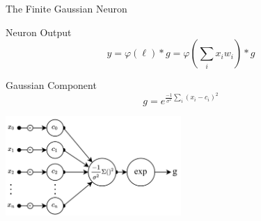 \documentclass{beamer}
\begin{document}
\begin{frame}{The Finite Gaussian Neuron}
    \begin{block}{Neuron Output}
        $$ y =  \varphi(\ell)*g = \varphi(\sum_i x_i w_i) * g$$
    \end{block}
    \begin{block}{Gaussian Component}
    $$ g = e^{\frac{-1}{\sigma^2}\sum_{i}(x_i-c_i)^2}$$
    \end{block}
    \begin{center}
        \includegraphics[width=0.5\textwidth]{images/fgn-gaussian-component.png}
    \end{center}
\end{frame}
\end{document}
